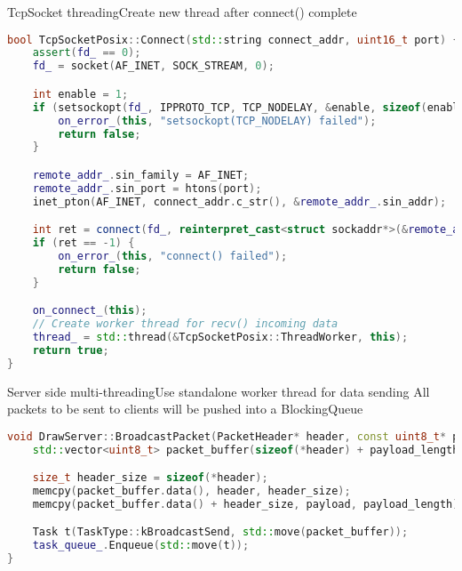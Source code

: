 \documentclass{beamer}
\begin{document}
\begin{frame}[fragile]{TcpSocket threading}{Create new thread after connect() complete}
\begin{lstlisting}[language=c++,basicstyle=\ttfamily\tiny]
bool TcpSocketPosix::Connect(std::string connect_addr, uint16_t port) {
    assert(fd_ == 0);
    fd_ = socket(AF_INET, SOCK_STREAM, 0);

    int enable = 1;
    if (setsockopt(fd_, IPPROTO_TCP, TCP_NODELAY, &enable, sizeof(enable)) == -1) {
        on_error_(this, "setsockopt(TCP_NODELAY) failed");
        return false;
    }

    remote_addr_.sin_family = AF_INET;
    remote_addr_.sin_port = htons(port);
    inet_pton(AF_INET, connect_addr.c_str(), &remote_addr_.sin_addr);

    int ret = connect(fd_, reinterpret_cast<struct sockaddr*>(&remote_addr_), sizeof(remote_addr_));
    if (ret == -1) {
        on_error_(this, "connect() failed");
        return false;
    }

    on_connect_(this);
    // Create worker thread for recv() incoming data
    thread_ = std::thread(&TcpSocketPosix::ThreadWorker, this);
    return true;
}
\end{lstlisting}
\end{frame}

\begin{frame}[fragile]{Server side multi-threading}{Use standalone worker thread for data sending}
All packets to be sent to clients will be pushed into a BlockingQueue
\newline
\begin{lstlisting}[language=c++,basicstyle=\ttfamily\tiny]
void DrawServer::BroadcastPacket(PacketHeader* header, const uint8_t* payload, size_t payload_length) {
    std::vector<uint8_t> packet_buffer(sizeof(*header) + payload_length);

    size_t header_size = sizeof(*header);
    memcpy(packet_buffer.data(), header, header_size);
    memcpy(packet_buffer.data() + header_size, payload, payload_length);

    Task t(TaskType::kBroadcastSend, std::move(packet_buffer));
    task_queue_.Enqueue(std::move(t));
}
\end{lstlisting}
\end{frame}
\end{document}
